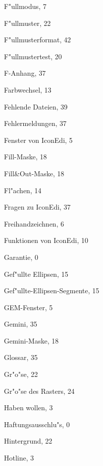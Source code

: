 \begin{theindex}
  \indexspace

  \item F"ullmodus, 7
  \item F"ullmuster, 22
  \item F"ullmusterformat, 42
  \item F"ullmustertest, 20
  \item F-Anhang, 37
  \item Farbwechsel, 13
  \item Fehlende Dateien, 39
  \item Fehlermeldungen, 37
  \item Fenster von IconEdi, 5
  \item Fill-Maske, 18
  \item Fill\&Out-Maske, 18
  \item Fl"achen, 14
  \item Fragen zu IconEdi, 37
  \item Freihandzeichnen, 6
  \item Funktionen von IconEdi, 10

  \indexspace

  \item Garantie, 0
  \item Gef"ullte Ellipsen, 15
  \item Gef"ullte-Ellipsen-Segmente, 15
  \item GEM-Fenster, 5
  \item Gemini, 35
  \item Gemini-Maske, 18
  \item Glossar, 35
  \item Gr"o"se, 22
  \item Gr"o"se des Rasters, 24

  \indexspace

  \item Haben wollen, 3
  \item Haftungsausschlu"s, 0
  \item Hintergrund, 22
  \item Hotline, 3

  \indexspace


\end{theindex}

